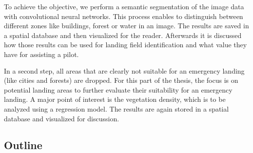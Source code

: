 To achieve the objective, we perform a semantic segmentation of the image data with convolutional neural networks. This process enables to distinguish between different zones like buildings, forest or water in an image. The results are saved in a spatial database and then visualized for the reader. Afterwards it is discussed how those results can be used for landing field identification and what value they have for assisting a pilot.

In a second step, all areas that are clearly not suitable for an emergency landing (like cities and forests) are dropped. For this part of the thesis, the focus is on potential landing areas to further evaluate their suitability for an emergency landing. A major point of interest is the vegetation density, which is to be analyzed using a regression model. The results are again stored in a spatial database and visualized for discussion.

\subsection{Outline}


\newpage